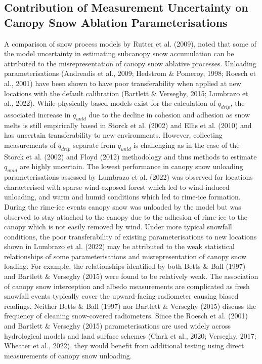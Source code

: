 \documentclass[
  letterpaper,
]{tex/uofsthesis-cs}
\begin{document}
\subsection{Contribution of Measurement Uncertainty on Canopy Snow
Ablation
Parameterisations}\label{contribution-of-measurement-uncertainty-on-canopy-snow-ablation-parameterisations}

A comparison of snow process models by Rutter et al. (2009), noted that
some of the model uncertainty in estimating subcanopy snow accumulation
can be attributed to the misrepresentation of canopy snow ablative
processes. Unloading parameterisations (Andreadis et al., 2009; Hedstrom
\& Pomeroy, 1998; Roesch et al., 2001) have been shown to have poor
transferability when applied at new locations with the default
calibration (Bartlett \& Verseghy, 2015; Lumbrazo et al., 2022). While
physically based models exist for the calculation of \(q_{drip}\), the
associated increase in \(q_{unld}\) due to the decline in cohesion and
adhesion as snow melts is still empirically based in Storck et al.
(2002) and Ellis et al. (2010) and has uncertain transferability to new
environments. However, collecting measurements of \(q_{drip}\) separate
from \(q_{unld}\) is challenging as in the case of the Storck et al.
(2002) and Floyd (2012) methodology and thus methods to estimate
\(q_{unld}\) are highly uncertain. The lowest performance in canopy snow
unloading parameterisations assessed by Lumbrazo et al. (2022) was
observed for locations characterised with sparse wind-exposed forest
which led to wind-induced unloading, and warm and humid conditions which
led to rime-ice formation. During the rime-ice events canopy snow was
unloaded by the model but was observed to stay attached to the canopy
due to the adhesion of rime-ice to the canopy which is not easily
removed by wind. Under more typical snowfall conditions, the poor
transferability of existing parameterisations to new locations shown in
Lumbrazo et al. (2022) may be attributed to the weak statistical
relationships of some parameterisations and misrepresentation of canopy
snow loading. For example, the relationships identified by both Betts \&
Ball (1997) and Bartlett \& Verseghy (2015) were found to be relatively
weak. The association of canopy snow interception and albedo
measurements are complicated as fresh snowfall events typically cover
the upward-facing radiometer causing biased readings. Neither Betts \&
Ball (1997) nor Bartlett \& Verseghy (2015) discuss the frequency of
cleaning snow-covered radiometers. Since the Roesch et al. (2001) and
Bartlett \& Verseghy (2015) parameterisations are used widely across
hydrological models and land surface schemes (Clark et al., 2020;
Verseghy, 2017; Wheater et al., 2022), they would benefit from
additional testing using direct measurements of canopy snow unloading.
\end{document}
